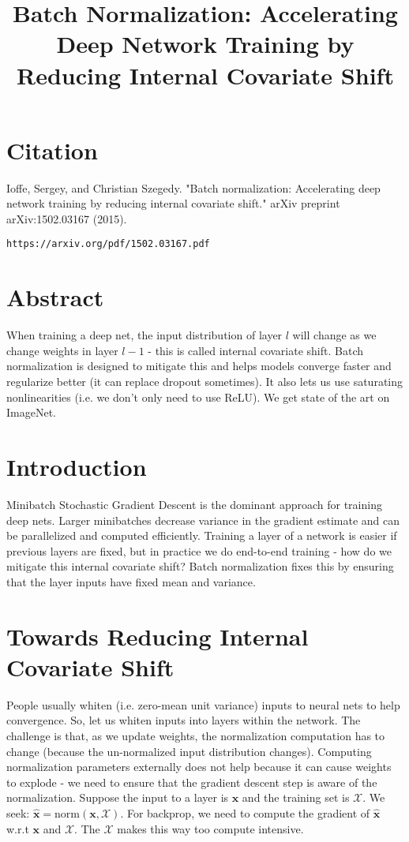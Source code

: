 \documentclass[a4paper]{article}
\title{Batch Normalization: Accelerating Deep Network Training by
Reducing Internal Covariate Shift}
\date{}
\begin{document}
\maketitle

\section{Citation}
Ioffe, Sergey, and Christian Szegedy. "Batch normalization: Accelerating deep network training by reducing internal covariate shift." arXiv preprint arXiv:1502.03167 (2015).

\begin{verbatim}
https://arxiv.org/pdf/1502.03167.pdf
\end{verbatim}

\section{Abstract}
When training a deep net, the input distribution of layer $l$ will change as we
change weights in layer $l - 1$ - this is called internal covariate shift.
Batch normalization is designed to mitigate this and helps models converge
faster and regularize better (it can replace dropout sometimes). It also lets
us use saturating nonlinearities (i.e. we don't only need to use ReLU).
We get state of the art on ImageNet.

\section{Introduction}
Minibatch Stochastic Gradient Descent is the dominant approach for training
deep nets. Larger minibatches decrease variance in the gradient estimate and
can be parallelized and computed efficiently. Training a layer of a network
is easier if previous layers are fixed, but in practice we do end-to-end
training - how do we mitigate this internal covariate shift? Batch normalization
fixes this by ensuring that the layer inputs have fixed mean and variance.

\section{Towards Reducing Internal Covariate Shift}
People usually whiten (i.e. zero-mean unit variance) inputs to neural nets to
help convergence. So, let us whiten inputs into layers within the network. The
challenge is that, as we update weights, the normalization computation has to
change (because the un-normalized input distribution changes). Computing
normalization parameters externally does not help because it can cause weights
to explode - we need to ensure that the gradient descent step is aware of the
normalization. Suppose the input to a layer is $\bm{x}$ and the training set is
$\mathcal{X}$. We seek: $\bm{\hat{x}} = \text{norm}(\bm{x}, \mathcal{X})$. For
backprop, we need to compute the gradient of $\bm{\hat{x}}$ w.r.t $\bm{x}$
and $\mathcal{X}$. The $\mathcal{X}$ makes this way too compute intensive.
\end{document}
